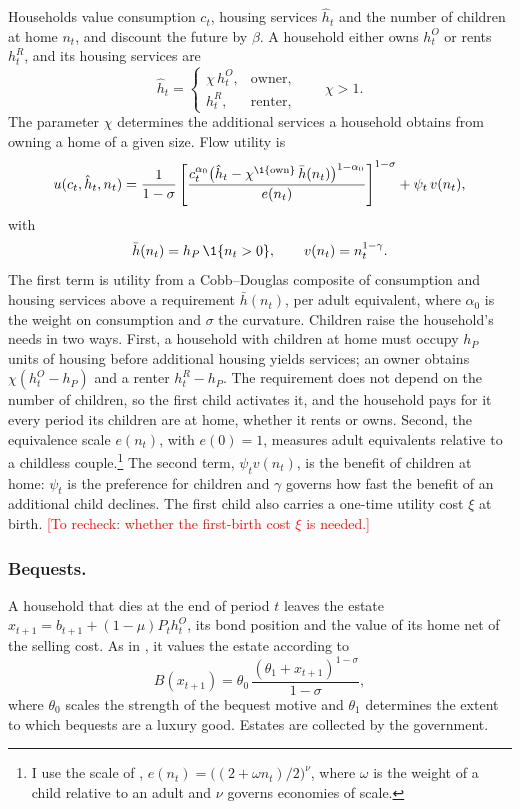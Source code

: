 Households value consumption $c_t$, housing services $\hat h_t$ and the
number of children at home $n_t$, and discount the future by $\beta$. A
household either owns $h^O_t$ or rents $h^R_t$, and its housing services are
\begin{equation*}
 \hat h_t=\begin{cases}\chi\,h^O_t, & \text{owner},\\ h^R_t, & \text{renter},\end{cases}
 \qquad \chi>1 .
\end{equation*}
The parameter $\chi$ determines the additional services a household obtains
from owning a home of a given size. Flow utility is
\begin{equation}
 u(c_t,\hat h_t,n_t)=\frac{1}{1-\sigma}\left[\frac{c_t^{\alpha_0}\bigl(\hat h_t-\chi^{\1\{\text{own}\}}\,\bar h(n_t)\bigr)^{1-\alpha_0}}{e(n_t)}\right]^{1-\sigma}+\psi_t\,v(n_t),
 \label{eq:m-utility}
\end{equation}
with
\begin{equation*}
 \bar h(n_t)=h_P\,\1\{n_t>0\},\qquad v(n_t)=n_t^{1-\gamma}.
\end{equation*}
The first term is utility from a Cobb--Douglas composite of consumption and
housing services above a requirement $\bar h(n_t)$, per adult equivalent,
where $\alpha_0$ is the weight on consumption and $\sigma$ the curvature.
Children raise the household's needs in two ways. First, a household with
children at home must occupy $h_P$ units of housing before additional housing
yields services; an owner obtains $\chi(h^O_t-h_P)$ and a renter $h^R_t-h_P$.
The requirement does not depend on the number of children, so the first
child activates it, and the household pays for it every period its children
are at home, whether it rents or owns. Second, the equivalence scale
$e(n_t)$, with $e(0)=1$, measures adult equivalents relative to a childless
couple.\footnote{I use the scale of
\citet{scholzSeshadriKhitatrakunSaving2006},
$e(n_t)=\bigl((2+\omega n_t)/2\bigr)^{\nu}$, where $\omega$ is the weight of
a child relative to an adult and $\nu$ governs economies of scale.} The second
term, $\psi_t v(n_t)$, is the benefit of children at home: $\psi_t$ is the
preference for children and $\gamma$ governs how fast the benefit of an
additional child declines. The first child also carries a one-time utility
cost $\xi$ at birth. \textcolor{red}{[To recheck: whether the first-birth
cost $\xi$ is needed.]}

\subsubsection*{Bequests.}
A household that dies at the end of period $t$ leaves the estate
$x_{t+1}=b_{t+1}+(1-\mu)P_th^O_t$, its bond position and the value of its
home net of the selling cost. As in \citet{deNardiWealthInequality2004}, it
values the estate according to
\begin{equation*}
 B(x_{t+1})=\theta_0\,\frac{(\theta_1+x_{t+1})^{1-\sigma}}{1-\sigma},
\end{equation*}
where $\theta_0$ scales the strength of the bequest motive and $\theta_1$
determines the extent to which bequests are a luxury good. Estates are
collected by the government.

